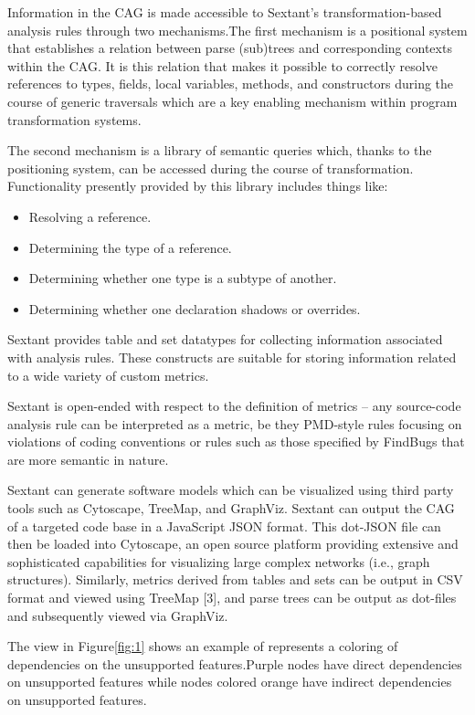 Information in the CAG is made accessible to Sextant’s transformation-based analysis rules through two mechanisms.The first mechanism is a positional system that establishes a relation between parse (sub)trees and corresponding contexts within the CAG. It is this relation that makes it possible to
correctly resolve references to types, fields, local variables, methods, and constructors during the course of generic traversals which are a key enabling mechanism within program transformation systems.

The second mechanism is a library of semantic queries which, thanks to the positioning system, can be accessed during the course of transformation. Functionality presently provided by this library includes things like:
\begin{itemize}
	\item Resolving a reference.
	\item Determining the type of a reference.
	\item Determining whether one type is a subtype of another.
	\item Determining whether one declaration shadows or overrides.
\end{itemize}
 
Sextant provides table and set datatypes for collecting information associated with analysis rules. These constructs are suitable for storing information related to a wide variety of custom metrics.

Sextant is open-ended with respect to the definition of metrics – any source-code analysis rule can be interpreted as a metric, be they PMD-style rules focusing on violations of coding conventions or rules such as those specified by FindBugs that are more semantic in nature.

Sextant can generate software models which can be visualized using third party tools such as Cytoscape, TreeMap, and GraphViz. Sextant can output the CAG of a targeted code base in a JavaScript JSON format. This dot-JSON file can then be loaded into Cytoscape, an open source platform providing
extensive and sophisticated capabilities for visualizing large complex networks (i.e., graph structures). Similarly, metrics derived from tables and sets can be output in CSV format and viewed using TreeMap [3], and parse trees can be output as dot-files and subsequently viewed via GraphViz.

The view in Figure\ref{fig:1} shows an example of represents a coloring of
dependencies on the unsupported features.Purple nodes have direct dependencies on unsupported features while nodes colored orange have indirect dependencies on unsupported features.

